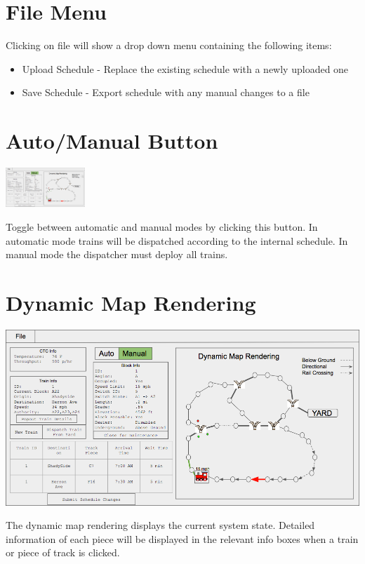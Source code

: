 \documentclass{scrreprt}
\begin{document}
\section{File Menu}
Clicking on file will show a drop down menu containing the following items:
\begin{itemize}
  \item Upload Schedule - Replace the existing schedule with a newly uploaded one
  \item Save Schedule - Export schedule with any manual changes to a file
\end{itemize}

\section{Auto/Manual Button}
\begin{center}
  \includegraphics[trim={9cm 14.65cm 20.8cm 1.7cm},clip,width=3cm]{CTC-main}
\end{center}
Toggle between automatic and manual modes by clicking this button. In automatic mode trains 
will be dispatched according to the internal schedule. In manual mode the dispatcher must 
deploy all trains.

\section{Dynamic Map Rendering}
\begin{center}
  \includegraphics[trim={17cm .65cm .5cm 1.75cm},clip,width=\textwidth]{CTC-main}
\end{center}
The dynamic map rendering displays the current system state. Detailed information of each 
piece will be displayed in the relevant info boxes when a train or piece of track is clicked.
\end{document}
